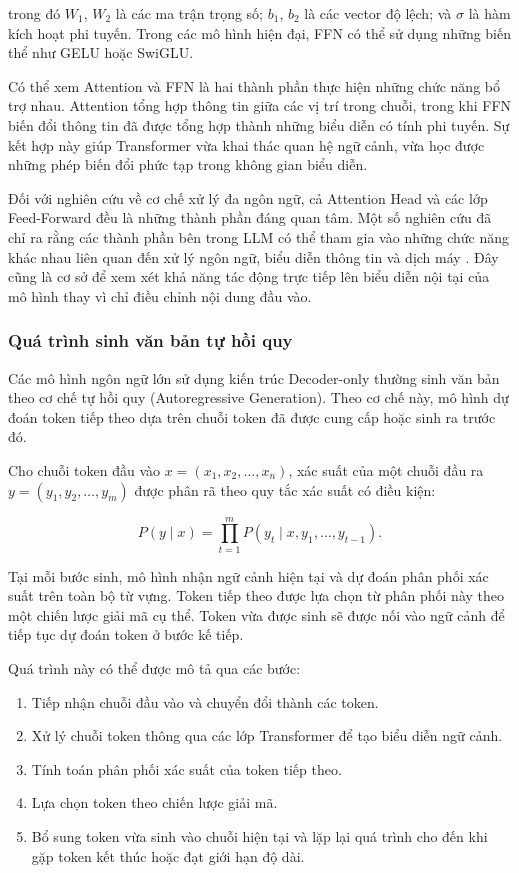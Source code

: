 trong đó $W_1$, $W_2$ là các ma trận trọng số; $b_1$, $b_2$ là các vector độ lệch; và $\sigma$ là hàm kích hoạt phi tuyến. Trong các mô hình hiện đại, FFN có thể sử dụng những biến thể như GELU hoặc SwiGLU.

Có thể xem Attention và FFN là hai thành phần thực hiện những chức năng bổ trợ nhau. Attention tổng hợp thông tin giữa các vị trí trong chuỗi, trong khi FFN biến đổi thông tin đã được tổng hợp thành những biểu diễn có tính phi tuyến. Sự kết hợp này giúp Transformer vừa khai thác quan hệ ngữ cảnh, vừa học được những phép biến đổi phức tạp trong không gian biểu diễn.

Đối với nghiên cứu về cơ chế xử lý đa ngôn ngữ, cả Attention Head và các lớp Feed-Forward đều là những thành phần đáng quan tâm. Một số nghiên cứu đã chỉ ra rằng các thành phần bên trong LLM có thể tham gia vào những chức năng khác nhau liên quan đến xử lý ngôn ngữ, biểu diễn thông tin và dịch máy \cite{tang-etal-2024-language,zhang2026exploring}. Đây cũng là cơ sở để xem xét khả năng tác động trực tiếp lên biểu diễn nội tại của mô hình thay vì chỉ điều chỉnh nội dung đầu vào.

\subsubsection{Quá trình sinh văn bản tự hồi quy}

Các mô hình ngôn ngữ lớn sử dụng kiến trúc Decoder-only thường sinh văn bản theo cơ chế tự hồi quy (Autoregressive Generation). Theo cơ chế này, mô hình dự đoán token tiếp theo dựa trên chuỗi token đã được cung cấp hoặc sinh ra trước đó.

Cho chuỗi token đầu vào $x=(x_1,x_2,\ldots,x_n)$, xác suất của một chuỗi đầu ra $y=(y_1,y_2,\ldots,y_m)$ được phân rã theo quy tắc xác suất có điều kiện:

\begin{equation}
    P(y\mid x)
    =
    \prod_{t=1}^{m}
    P(y_t\mid x,y_1,\ldots,y_{t-1}).
\end{equation}

Tại mỗi bước sinh, mô hình nhận ngữ cảnh hiện tại và dự đoán phân phối xác suất trên toàn bộ từ vựng. Token tiếp theo được lựa chọn từ phân phối này theo một chiến lược giải mã cụ thể. Token vừa được sinh sẽ được nối vào ngữ cảnh để tiếp tục dự đoán token ở bước kế tiếp.

Quá trình này có thể được mô tả qua các bước:

\begin{enumerate}
    \item Tiếp nhận chuỗi đầu vào và chuyển đổi thành các token.
    \item Xử lý chuỗi token thông qua các lớp Transformer để tạo biểu diễn ngữ cảnh.
    \item Tính toán phân phối xác suất của token tiếp theo.
    \item Lựa chọn token theo chiến lược giải mã.
    \item Bổ sung token vừa sinh vào chuỗi hiện tại và lặp lại quá trình cho đến khi gặp token kết thúc hoặc đạt giới hạn độ dài.
\end{enumerate}

